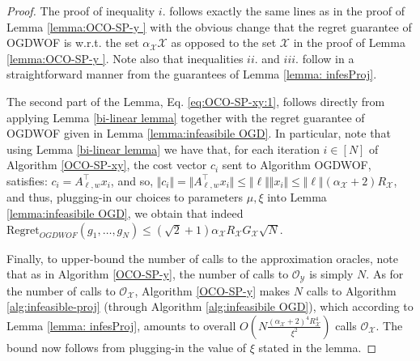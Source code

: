 \documentclass[a4paper,12pt]{article}
\newcommand{\mY}{\mathcal{Y}}
\newcommand{\mX}{\mathcal{X}}
\newcommand{\oraclex}{\mathcal{O}_{\mX}}
\newcommand{\oracley}{\mathcal{O}_{\mY}}
\begin{document}
\begin{proof}
The proof of inequality $i.$ follows exactly the same lines as in the proof of Lemma \ref{lemma:OCO-SP-y } with the obvious change that the regret guarantee of OGDWOF is w.r.t. the set $\alpha_{\mX}\mX$ as opposed to the set $\mX$ in the proof  of Lemma \ref{lemma:OCO-SP-y }. Note also that inequalities $ii.$ and $iii.$ follow in a straightforward manner  from the guarantees of Lemma \ref{lemma: infesProj}.

The second part of the Lemma, Eq. \eqref{eq:OCO-SP-xy:1}, follows directly from applying Lemma \ref{bi-linear lemma} together with the regret guarantee of OGDWOF given in Lemma \ref{lemma:infeasibile OGD}.  In particular, note that using  Lemma \ref{bi-linear lemma} we have that, for each iteration $i\in[N]$ of Algorithm \ref{OCO-SP-xy}, the cost vector $c_i$ sent to Algorithm OGDWOF, satisfies: $c_i = A_{\ell,w}^{\top}x_i$, and so, $\Vert{c_i}\Vert = \Vert{A_{\ell,w}^{\top}x_i}\Vert \leq \Vert{\ell}\Vert\Vert{x_i}\Vert \leq \Vert{\ell}\Vert(\alpha_{\mX}+2)R_{\mX}$, and thus, plugging-in our choices to parameters $\mu,\xi$ into Lemma \ref{lemma:infeasibile OGD}, we obtain that indeed $\text{Regret}_{OGDWOF}(g_1,\dots,g_N) \leq (\sqrt{2}+1)\alpha_{\mX}R_{\mX}G_{\mX}\sqrt{N}$. 

Finally, to upper-bound the number of calls to the approximation oracles, note that as in Algorithm \ref{OCO-SP-y}, the number of calls to $\oracley$ is simply $N$. As for the number of calls to $\oraclex$, Algorithm \ref{OCO-SP-y} makes $N$ calls to Algorithm \ref{alg:infeasible-proj} (through Algorithm \ref{alg:infeasibile OGD}), which according to Lemma \ref{lemma: infesProj}, amounts to overall $O\left({N\frac{(\alpha_{\mX}+2)^4R_{\mX}^4}{\xi^2}}\right)$ calls $\oraclex$. The bound now follows from plugging-in the value of $\xi$ stated in the lemma.
 

\end{proof}
\end{document}
